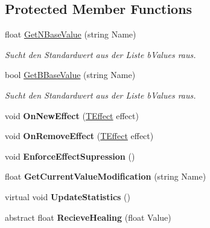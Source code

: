 \subsection*{Protected Member Functions}
\begin{DoxyCompactItemize}
\item 
float \hyperlink{class_r_p_g_object_ab05437a7714f58d52ee610f1fb9c052b}{Get\+N\+Base\+Value} (string Name)
\begin{DoxyCompactList}\small\item\em Sucht den Standardwert aus der Liste b\+Values raus. \end{DoxyCompactList}\item 
bool \hyperlink{class_r_p_g_object_a7772162c56eed453f9f97b6ac01bc48b}{Get\+B\+Base\+Value} (string Name)
\begin{DoxyCompactList}\small\item\em Sucht den Standardwert aus der Liste b\+Values raus. \end{DoxyCompactList}\item 
\hypertarget{class_r_p_g_object_a766f2912c7947d76a429a373b3073ce2}{}void {\bfseries On\+New\+Effect} (\hyperlink{class_t_effect}{T\+Effect} effect)\label{class_r_p_g_object_a766f2912c7947d76a429a373b3073ce2}

\item 
\hypertarget{class_r_p_g_object_a3c97b73354e9eec8e3ad5d85308ba728}{}void {\bfseries On\+Remove\+Effect} (\hyperlink{class_t_effect}{T\+Effect} effect)\label{class_r_p_g_object_a3c97b73354e9eec8e3ad5d85308ba728}

\item 
\hypertarget{class_r_p_g_object_af344332996644a20d6a3b87d8c22b89f}{}void {\bfseries Enforce\+Effect\+Supression} ()\label{class_r_p_g_object_af344332996644a20d6a3b87d8c22b89f}

\item 
\hypertarget{class_r_p_g_object_a4480d28e80d2f5d59c0b831817c74621}{}float {\bfseries Get\+Current\+Value\+Modification} (string Name)\label{class_r_p_g_object_a4480d28e80d2f5d59c0b831817c74621}

\item 
\hypertarget{class_r_p_g_object_a548b39ae1ef3c7084662289fc801101c}{}virtual void {\bfseries Update\+Statistics} ()\label{class_r_p_g_object_a548b39ae1ef3c7084662289fc801101c}

\item 
\hypertarget{class_r_p_g_object_a6b796a1ff13ea340a81690ee81d62848}{}abstract float {\bfseries Recieve\+Healing} (float Value)\label{class_r_p_g_object_a6b796a1ff13ea340a81690ee81d62848}

\end{DoxyCompactItemize}
